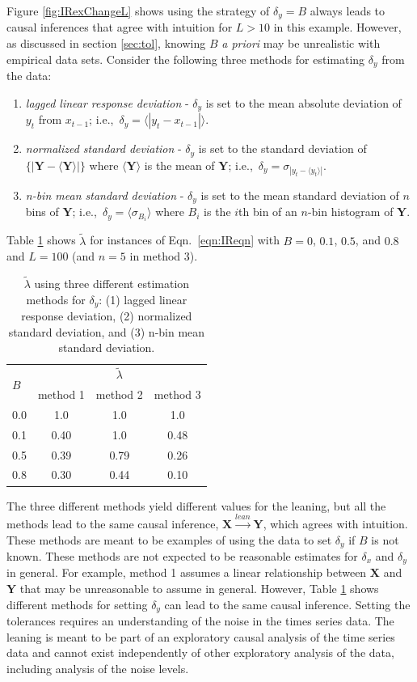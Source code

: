 \documentclass[twocolumn,aps,pre,groupedaddress]{revtex4-1}
\begin{document}
Figure \ref{fig:IRexChangeL} shows using the strategy of $\delta_y = B$ always leads to causal inferences that agree with intuition for $L>10$ in this example.  However, as discussed in section \ref{sec:tol}, knowing $B$ {\em a priori} may be unrealistic with empirical data sets.  Consider the following three methods for estimating $\delta_y$ from the data:
\begin{enumerate}
\item {\em lagged linear response deviation} - $\delta_y$ is set to the mean absolute deviation of $y_t$ from $x_{t-1}$; i.e.,\ $\delta_y = \langle|y_t-x_{t-1}|\rangle$.
\item {\em normalized standard deviation} - $\delta_y$ is set to the standard deviation of $\{|\mathbf{Y}-\langle\mathbf{Y}\rangle|\}$ where $\langle\mathbf{Y}\rangle$ is the mean of $\mathbf{Y}$; i.e.,\ $\delta_y = \sigma_{|y_t-\langle y_t\rangle|}$.
\item {\em n-bin mean standard deviation} - $\delta_y$ is set to the mean standard deviation of $n$ bins of $\mathbf{Y}$; i.e.,\ $\delta_y = \langle \sigma_{B_i}\rangle$ where $B_i$ is the $i$th bin of an $n$-bin histogram of $\mathbf{Y}$.    
\end{enumerate}  
Table \ref{tab:IRlagTolComp} shows $\tilde{\lambda}$ for instances of Eqn.\ \ref{eqn:IReqn} with $B = 0$, $0.1$, $0.5$, and $0.8$ and $L=100$ (and $n=5$ in method 3).
\begin{table}
\begin{tabular}{l|ccc}
 \multirow{2}{*}{ $B$ }& \multicolumn{3}{|c}{$\tilde{\lambda}$}\\
 \cline{2-4}
 & method 1 & method 2 & method 3\\
\hline
0.0 & 1.0 & 1.0 & 1.0\\
0.1 & 0.40 & 1.0 & 0.48\\
0.5 & 0.39 & 0.79 & 0.26\\
0.8 & 0.30 & 0.44 & 0.10\\
\end{tabular}
\caption{$\tilde{\lambda}$ using three different estimation methods for $\delta_y$: (1) lagged linear response deviation, (2) normalized standard deviation, and (3) n-bin mean standard deviation.}
\label{tab:IRlagTolComp}
\end{table}

The three different methods yield different values for the leaning, but all the methods lead to the same causal inference, $\mathbf{X}\xrightarrow{lean}\mathbf{Y}$, which agrees with intuition.  These methods are meant to be examples of using the data to set $\delta_y$ if $B$ is not known.  These methods are not expected to be reasonable estimates for $\delta_x$ and $\delta_y$ in general.  For example, method 1 assumes a linear relationship between $\mathbf{X}$ and $\mathbf{Y}$ that may be unreasonable to assume in general.  However, Table \ref{tab:IRlagTolComp} shows different methods for setting $\delta_y$ can lead to the same causal inference.  Setting the tolerances requires an understanding of the noise in the times series data.  The leaning is meant to be part of an exploratory causal analysis of the time series data and cannot exist independently of other exploratory analysis of the data, including analysis of the noise levels.  
\end{document}
